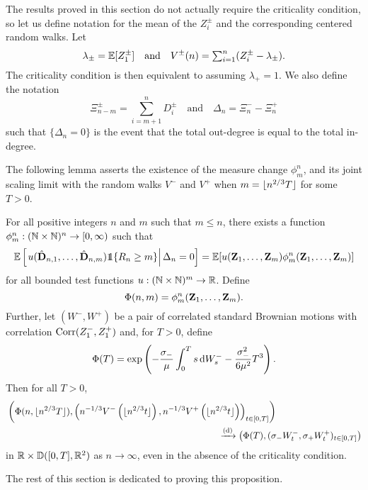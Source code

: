 The results proved in this section do not actually require the criticality condition, so let us define notation for the mean of the $Z_i^{\pm}$ and the corresponding centered random walks. Let
\begin{equation*}
    \lambda_{\pm} = {\mathbb E}[Z^{\pm}_1]
    \quad \text{and} \quad
    V^{\pm}(n) = \textstyle \sum_{i=1}^n (Z^{\pm}_i - \lambda_{\pm}).
\end{equation*}
The criticality condition is then equivalent to assuming $\lambda_+ = 1$. We also define the notation
\begin{equation*}
    \Xi^{\pm}_{n-m} = \sum_{i=m+1}^n D_i^{\pm}
    \quad \text{and} \quad
    \Delta_n = \Xi^-_n - \Xi^+_n
\end{equation*}
such that $\{\Delta_n = 0\}$ is the event that the total out-degree is equal to the total in-degree.

The following lemma asserts the existence of the measure change $\phi^n_m$, and its joint scaling limit with the random walks $V^-$ and $V^+$ when $m = \lfloor n^{2/3} T\rfloor$ for some $T > 0$.
\begin{proposition}
    \label{prop:measure-change-no-crit}
    For all positive integers $n$ and $m$ such that $m \leq n$, there exists a function $\phi^n_m: ({\mathbb N} \times {\mathbb N})^n \to [0, \infty)$ such that 
    \begin{equation*}
        \E\left[\left.u(\hat{\vD}_{n, 1}, \ldots, \hat{\vD}_{n, m}) \one\{R_n \geq m\} \right| \Delta_n = 0\right]
        = \E[u(\vZ_1, \ldots, \vZ_m) \phi^n_m(\vZ_1, \ldots, \vZ_m)]
    \end{equation*}
    for all bounded test functions $u: ({\mathbb N} \times {\mathbb N})^m \to {\mathbb R}$. Define
    \begin{equation*}
        \Phi(n, m) = \phi^n_m({\mathbf Z}_1, \ldots, {\mathbf Z}_m).
    \end{equation*}
    Further, let $(W^-, W^+)$ be a pair of correlated standard Brownian motions with correlation $\operatorname{Corr}(Z_1^-, Z_1^+)$ and, for $T > 0$, define
    \begin{equation*}
        \Phi(T) = \exp\left( 
            - \frac{\sigma_-}{\mu} \int_0^T s \mathop{}\!\mathrm{d} W_s^- 
            - \frac{\sigma_-^2}{6 \mu^2} T^3
        \right).
    \end{equation*}
    Then for all $T > 0$,
    \begin{align*}
        &\left( 
            \Phi(n, \floor{n^{2/3} T}),
            \left(
                n^{-1/3} V^-\left( \floor{n^{2/3} t} \right),
                n^{-1/3} V^+\left( \floor{n^{2/3} t} \right)
            \right)_{t \in [0, T]}
        \right) \\
        & \hspace{23em} \todist \left( 
            \Phi(T),
            (\sigma_- W^-_t, \sigma_+ W^+_t)_{t \in [0, T]}
        \right)
    \end{align*}
    in ${\mathbb R} \times {\mathbb D}([0, T], {\mathbb R}^2)$ as $n \to \infty$, even in the absence of the criticality condition.
\end{proposition}
The rest of this section is dedicated to proving this proposition.

